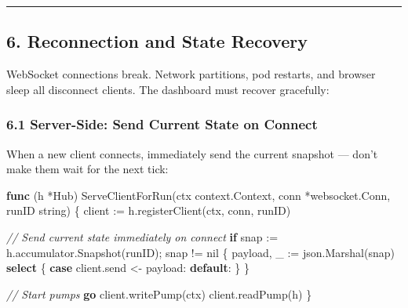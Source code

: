 \documentclass[
]{article}
\newenvironment{Shaded}{}{}
\newcommand{\CommentTok}[1]{\textcolor[rgb]{0.38,0.63,0.69}{\textit{#1}}}
\newcommand{\ControlFlowTok}[1]{\textcolor[rgb]{0.00,0.44,0.13}{\textbf{#1}}}
\newcommand{\DataTypeTok}[1]{\textcolor[rgb]{0.56,0.13,0.00}{#1}}
\newcommand{\KeywordTok}[1]{\textcolor[rgb]{0.00,0.44,0.13}{\textbf{#1}}}
\newcommand{\NormalTok}[1]{#1}
\newcommand{\OperatorTok}[1]{\textcolor[rgb]{0.40,0.40,0.40}{#1}}
\newcommand{\OtherTok}[1]{\textcolor[rgb]{0.00,0.44,0.13}{#1}}
\begin{document}
\begin{center}\rule{0.5\linewidth}{0.5pt}\end{center}

\hypertarget{reconnection-and-state-recovery}{%
\subsection{6. Reconnection and State
Recovery}\label{reconnection-and-state-recovery}}

WebSocket connections break. Network partitions, pod restarts, and
browser sleep all disconnect clients. The dashboard must recover
gracefully:

\hypertarget{server-side-send-current-state-on-connect}{%
\subsubsection{6.1 Server-Side: Send Current State on
Connect}\label{server-side-send-current-state-on-connect}}

When a new client connects, immediately send the current snapshot ---
don't make them wait for the next tick:

\begin{Shaded}
\begin{Highlighting}[]
\KeywordTok{func} \OperatorTok{(}\NormalTok{h }\OperatorTok{*}\NormalTok{Hub}\OperatorTok{)}\NormalTok{ ServeClientForRun}\OperatorTok{(}\NormalTok{ctx context}\OperatorTok{.}\NormalTok{Context}\OperatorTok{,}\NormalTok{ conn }\OperatorTok{*}\NormalTok{websocket}\OperatorTok{.}\NormalTok{Conn}\OperatorTok{,}\NormalTok{ runID }\DataTypeTok{string}\OperatorTok{)} \OperatorTok{\{}
\NormalTok{    client }\OperatorTok{:=}\NormalTok{ h}\OperatorTok{.}\NormalTok{registerClient}\OperatorTok{(}\NormalTok{ctx}\OperatorTok{,}\NormalTok{ conn}\OperatorTok{,}\NormalTok{ runID}\OperatorTok{)}

    \CommentTok{// Send current state immediately on connect}
    \ControlFlowTok{if}\NormalTok{ snap }\OperatorTok{:=}\NormalTok{ h}\OperatorTok{.}\NormalTok{accumulator}\OperatorTok{.}\NormalTok{Snapshot}\OperatorTok{(}\NormalTok{runID}\OperatorTok{);}\NormalTok{ snap }\OperatorTok{!=} \OtherTok{nil} \OperatorTok{\{}
\NormalTok{        payload}\OperatorTok{,}\NormalTok{ \_ }\OperatorTok{:=}\NormalTok{ json}\OperatorTok{.}\NormalTok{Marshal}\OperatorTok{(}\NormalTok{snap}\OperatorTok{)}
        \ControlFlowTok{select} \OperatorTok{\{}
        \ControlFlowTok{case}\NormalTok{ client}\OperatorTok{.}\NormalTok{send }\OperatorTok{\textless{}{-}}\NormalTok{ payload}\OperatorTok{:}
        \ControlFlowTok{default}\OperatorTok{:}
        \OperatorTok{\}}
    \OperatorTok{\}}

    \CommentTok{// Start pumps}
    \ControlFlowTok{go}\NormalTok{ client}\OperatorTok{.}\NormalTok{writePump}\OperatorTok{(}\NormalTok{ctx}\OperatorTok{)}
\NormalTok{    client}\OperatorTok{.}\NormalTok{readPump}\OperatorTok{(}\NormalTok{h}\OperatorTok{)}
\OperatorTok{\}}
\end{Highlighting}
\end{Shaded}
\end{document}
